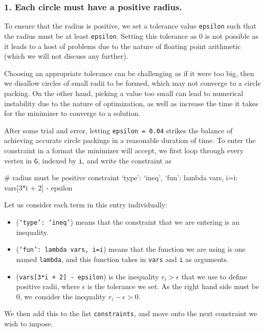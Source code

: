\subsubsection{1. Each circle must have a positive radius.}

\begin{flushleft}
To ensure that the radius is positive, we set a tolerance value \texttt{epsilon} such that the radius must be at least \texttt{epsilon}. Setting this tolerance as 0 is not possible as it leads to a host of problems due to the nature of floating point arithmetic (which we will not discuss any further). 
\end{flushleft}

\begin{flushleft}
Choosing an appropriate tolerance can be challenging as if it were too big, then we disallow circles of small radii to be formed, which may not converge to a circle packing. On the other hand, picking a value too small can lead to numerical instability due to the nature of optimization, as well as increase the time it takes for the minimizer to converge to a solution.
\end{flushleft}

\begin{flushleft}
After some trial and error, letting \texttt{epsilon = 0.04} strikes the balance of achieving accurate circle packings in a reasonable duration of time. To enter the constraint in a format the minimizer will accept, we first loop through every vertex in \texttt{G}, indexed by \texttt{i}, and write the constraint as 
\end{flushleft}

\begin{code}
    # radius must be positive constraint
    {`type': `ineq', `fun': lambda vars, i=i: vars[3*i + 2] - epsilon}
\end{code}

\begin{flushleft}
Let us consider each term in this entry individually:

\begin{itemize}
    \item (\texttt{`type': `ineq'}) means that the constraint that we are entering is an inequality.
    \vspace{-3mm}
    \item (\texttt{`fun': lambda vars, i=i}) means that the function we are using is one named \texttt{lambda}, and this function takes in \texttt{vars} and \texttt{i} as arguments.
    \vspace{-3mm}
    \item (\texttt{vars[3*i + 2] - epsilon}) is the inequality $r_i > \epsilon$ that we use to define positive radii, where $\epsilon$ is the tolerance we set. As the right hand side must be 0, we consider the inequality $r_i - \epsilon > 0$.
\end{itemize}

We then add this to the list \texttt{constraints}, and move onto the next constraint we wish to impose. 
\end{flushleft}


